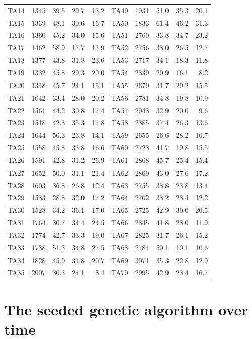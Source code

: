 \documentclass[11pt]{article}
\begin{document}
\begin{table}[!htb]
\begin{tabular}{lrrrr@{\hskip 0.9em}|@{\hskip 0.9em}lrrrr}
TA14 & 1345 & 39.5 & 29.7 & 13.2 & TA49 & 1931 & 51.0 & 35.3 & 20.1 \\
TA15 & 1339 & 48.1 & 30.6 & 16.7 & TA50 & 1833 & 61.4 & 46.2 & 31.3 \\
TA16 & 1360 & 45.2 & 34.0 & 15.6 & TA51 & 2760 & 33.8 & 34.7 & 23.2 \\
TA17 & 1462 & 58.9 & 17.7 & 13.9 & TA52 & 2756 & 38.0 & 26.5 & 12.7 \\
TA18 & 1377 & 43.8 & 31.8 & 23.6 & TA53 & 2717 & 34.1 & 18.3 & 11.8 \\
TA19 & 1332 & 45.8 & 29.3 & 20.0 & TA54 & 2839 & 20.9 & 16.1 & 8.2 \\
TA20 & 1348 & 45.7 & 24.1 & 15.1 & TA55 & 2679 & 31.7 & 29.2 & 15.5 \\
TA21 & 1642 & 33.4 & 28.0 & 20.2 & TA56 & 2781 & 34.8 & 19.8 & 10.9 \\
TA22 & 1561 & 44.2 & 30.8 & 17.4 & TA57 & 2943 & 32.9 & 20.0 & 9.6 \\
TA23 & 1518 & 42.8 & 35.3 & 17.8 & TA58 & 2885 & 37.4 & 26.3 & 13.6 \\
TA24 & 1644 & 56.3 & 23.8 & 14.1 & TA59 & 2655 & 26.6 & 28.2 & 16.7 \\
TA25 & 1558 & 45.8 & 33.8 & 16.6 & TA60 & 2723 & 41.7 & 19.8 & 15.5 \\
TA26 & 1591 & 42.8 & 31.2 & 26.9 & TA61 & 2868 & 45.7 & 25.4 & 15.4 \\
TA27 & 1652 & 50.0 & 31.1 & 21.4 & TA62 & 2869 & 43.0 & 27.6 & 17.2 \\
TA28 & 1603 & 36.8 & 26.8 & 12.4 & TA63 & 2755 & 38.8 & 23.8 & 13.4 \\
TA29 & 1583 & 28.8 & 32.0 & 17.2 & TA64 & 2702 & 38.2 & 28.4 & 12.2 \\
TA30 & 1528 & 34.2 & 36.1 & 17.0 & TA65 & 2725 & 42.9 & 30.0 & 20.5 \\
TA31 & 1764 & 30.7 & 34.4 & 24.5 & TA66 & 2845 & 41.8 & 28.0 & 11.9 \\
TA32 & 1774 & 42.7 & 33.3 & 19.0 & TA67 & 2825 & 31.7 & 26.1 & 15.2 \\
TA33 & 1788 & 51.3 & 34.8 & 27.5 & TA68 & 2784 & 50.1 & 19.1 & 10.6 \\
TA34 & 1828 & 45.9 & 31.8 & 20.7 & TA69 & 3071 & 35.3 & 22.8 & 12.9 \\
TA35 & 2007 & 30.3 & 24.1 & 8.4 & TA70 & 2995 & 42.9 & 23.4 & 16.7 \\
\bottomrule
\end{tabular}
\end{table}

\section{The seeded genetic algorithm over time}
\label{sec:semilla}
\end{document}
